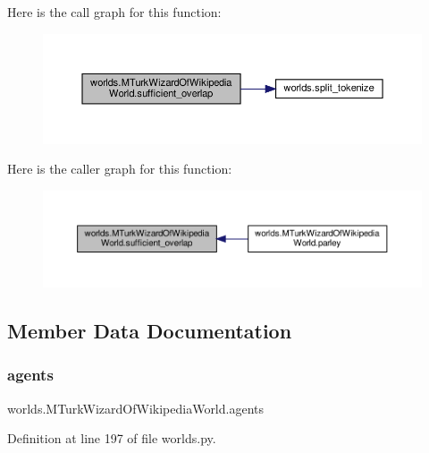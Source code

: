 Here is the call graph for this function\+:
\nopagebreak
\begin{figure}[H]
\begin{center}
\leavevmode
\includegraphics[width=350pt]{classworlds_1_1MTurkWizardOfWikipediaWorld_a4b49dac2356a6684979f3b4c81057773_cgraph}
\end{center}
\end{figure}
Here is the caller graph for this function\+:
\nopagebreak
\begin{figure}[H]
\begin{center}
\leavevmode
\includegraphics[width=350pt]{classworlds_1_1MTurkWizardOfWikipediaWorld_a4b49dac2356a6684979f3b4c81057773_icgraph}
\end{center}
\end{figure}


\subsection{Member Data Documentation}
\mbox{\label{classworlds_1_1MTurkWizardOfWikipediaWorld_ad379b376ca949228453ed6340b93da89}} 
\subsubsection{\texorpdfstring{agents}{agents}}
{\footnotesize\ttfamily worlds.\+M\+Turk\+Wizard\+Of\+Wikipedia\+World.\+agents}



Definition at line 197 of file worlds.\+py.



